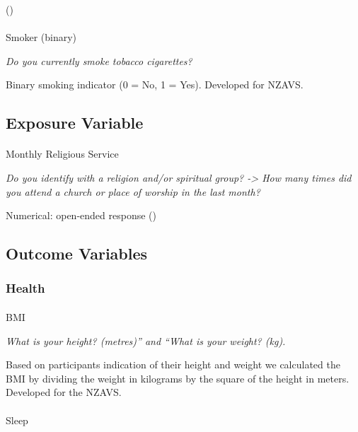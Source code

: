 \documentclass[
  single column]{article}
\makeatletter
\let\oldparagraph\paragraph
\renewcommand{\paragraph}{
    \@ifstar
      \xxxParagraphStar
      \xxxParagraphNoStar
  }
\newcommand{\xxxParagraphStar}[1]{\oldparagraph*{#1}\mbox{}}
\newcommand{\xxxParagraphNoStar}[1]{\oldparagraph{#1}\mbox{}}
\makeatother
\begin{document}
()

\paragraph{Smoker (binary)}\label{smoker-binary}

\emph{Do you currently smoke tobacco cigarettes?}

Binary smoking indicator (0 = No, 1 = Yes). Developed for NZAVS.

\subsection{Exposure Variable}\label{exposure-variable}

\paragraph{Monthly Religious Service}\label{monthly-religious-service}

\emph{Do you identify with a religion and/or spiritual group?
-\textgreater{} How many times did you attend a church or place of
worship in the last month?}

Numerical: open-ended response ()

\subsection{Outcome Variables}\label{outcome-variables}

\subsubsection{Health}\label{health-1}

\paragraph{BMI}\label{bmi-1}

\emph{What is your height? (metres)'' and ``What is your weight? (kg).}

Based on participants indication of their height and weight we
calculated the BMI by dividing the weight in kilograms by the square of
the height in meters. Developed for the NZAVS.

\paragraph{Sleep}\label{sleep}
\end{document}

